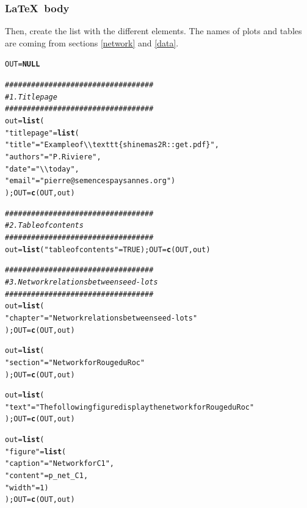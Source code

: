 \documentclass{article}\usepackage[]{graphicx}\usepackage[]{color}
\makeatletter
\newcommand{\hlnum}[1]{\textcolor[rgb]{0.686,0.059,0.569}{#1}}%
\newcommand{\hlstr}[1]{\textcolor[rgb]{0.192,0.494,0.8}{#1}}%
\newcommand{\hlcom}[1]{\textcolor[rgb]{0.678,0.584,0.686}{\textit{#1}}}%
\newcommand{\hlstd}[1]{\textcolor[rgb]{0.345,0.345,0.345}{#1}}%
\newcommand{\hlkwa}[1]{\textcolor[rgb]{0.161,0.373,0.58}{\textbf{#1}}}%
\newcommand{\hlkwb}[1]{\textcolor[rgb]{0.69,0.353,0.396}{#1}}%
\newcommand{\hlkwd}[1]{\textcolor[rgb]{0.737,0.353,0.396}{\textbf{#1}}}%
\newenvironment{kframe}{%
 \def\at@end@of@kframe{}%
 \ifinner\ifhmode%
  \def\at@end@of@kframe{\end{minipage}}%
  \begin{minipage}{\columnwidth}%
 \fi\fi%
 \def\FrameCommand##1{\hskip\@totalleftmargin \hskip-\fboxsep
 \colorbox{shadecolor}{##1}\hskip-\fboxsep
     \hskip-\linewidth \hskip-\@totalleftmargin \hskip\columnwidth}%
 \MakeFramed {\advance\hsize-\width
   \@totalleftmargin\z@ \linewidth\hsize
   \@setminipage}}%
 {\par\unskip\endMakeFramed%
 \at@end@of@kframe}
\newenvironment{knitrout}{}{} %
\makeatother
\begin{document}
\subsubsection{\LaTeX~body}

Then, create the list with the different elements.
The names of plots and tables are coming from sections \ref{network} and \ref{data}.


\begin{knitrout}
\color{fgcolor}\begin{kframe}
\begin{alltt}
\hlstd{OUT} \hlkwb{=} \hlkwa{NULL}

\hlcom{##################################}
\hlcom{# 1. Title page }
\hlcom{##################################}
\hlstd{out} \hlkwb{=} \hlkwd{list}\hlstd{(}
        \hlstr{"titlepage"} \hlstd{=} \hlkwd{list}\hlstd{(}
                \hlstr{"title"} \hlstd{=} \hlstr{"Example of \textbackslash{}\textbackslash{}texttt\{shinemas2R::get.pdf\}"}\hlstd{,}
                \hlstr{"authors"} \hlstd{=} \hlstr{"P. Riviere"}\hlstd{,}
                \hlstr{"date"} \hlstd{=} \hlstr{"\textbackslash{}\textbackslash{}today"}\hlstd{,}
                \hlstr{"email"} \hlstd{=} \hlstr{"pierre@semencespaysannes.org"}\hlstd{)}
        \hlstd{); OUT} \hlkwb{=} \hlkwd{c}\hlstd{(OUT, out)}


\hlcom{##################################}
\hlcom{# 2. Table of contents}
\hlcom{##################################}
\hlstd{out} \hlkwb{=} \hlkwd{list}\hlstd{(}\hlstr{"tableofcontents"} \hlstd{=} \hlnum{TRUE}\hlstd{); OUT} \hlkwb{=} \hlkwd{c}\hlstd{(OUT, out)}


\hlcom{##################################}
\hlcom{# 3. Network relations between seed-lots}
\hlcom{##################################}
\hlstd{out} \hlkwb{=} \hlkwd{list}\hlstd{(}
        \hlstr{"chapter"} \hlstd{=} \hlstr{"Network relations between seed-lots"}
        \hlstd{); OUT} \hlkwb{=} \hlkwd{c}\hlstd{(OUT, out)}

\hlstd{out} \hlkwb{=} \hlkwd{list}\hlstd{(}
        \hlstr{"section"} \hlstd{=} \hlstr{"Network for Rouge du Roc"}
        \hlstd{); OUT} \hlkwb{=} \hlkwd{c}\hlstd{(OUT, out)}

\hlstd{out} \hlkwb{=} \hlkwd{list}\hlstd{(}
        \hlstr{"text"} \hlstd{=} \hlstr{"The following figure display the network for Rouge du Roc"}
        \hlstd{); OUT} \hlkwb{=} \hlkwd{c}\hlstd{(OUT, out)}

\hlstd{out} \hlkwb{=} \hlkwd{list}\hlstd{(}
        \hlstr{"figure"} \hlstd{=} \hlkwd{list}\hlstd{(}
                \hlstr{"caption"} \hlstd{=} \hlstr{"Network for C1"}\hlstd{,}
                \hlstr{"content"} \hlstd{= p_net_C1,}
                \hlstr{"width"} \hlstd{=} \hlnum{1}\hlstd{)}
        \hlstd{); OUT} \hlkwb{=} \hlkwd{c}\hlstd{(OUT, out)}


\end{alltt}
\end{kframe}
\end{knitrout}
\end{document}
